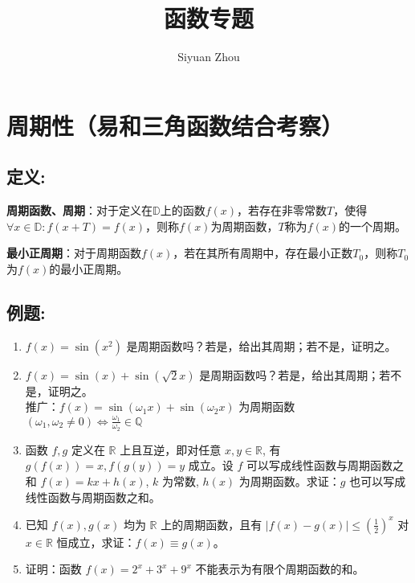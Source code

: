 \documentclass{ctexart}
\title{函数专题}
\author{Siyuan Zhou}
\begin{document}
\maketitle

\section*{周期性（易和三角函数结合考察）}

\subsection*{定义:}
\textbf{周期函数、周期}：对于定义在$\mathbb{D}$上的函数$f(x)$，若存在非零常数$T$，使得$\forall x \in \mathbb{D}: f(x+T) = f(x)$，则称$f(x)$为周期函数，$T$称为$f(x)$的一个周期。\\
\par
\textbf{最小正周期}：对于周期函数$f(x)$，若在其所有周期中，存在最小正数$T_0$，则称$T_0$为$f(x)$的最小正周期。

\subsection*{例题:}
\begin{enumerate}
  \item $f(x)=\sin(x^2)$ 是周期函数吗？若是，给出其周期；若不是，证明之。
  \vspace{20mm}
  \item $f(x)=\sin(x) + \sin(\sqrt{2}x)$ 是周期函数吗？若是，给出其周期；若不是，证明之。\\
    推广：$f(x)=\sin(\omega_1x) + \sin(\omega_2x)$ 为周期函数 $(\omega_1,\omega_2 \neq 0) \Leftrightarrow \frac{\omega_1}{\omega_2} \in \mathbb{Q}$
    \vspace{20mm}
  \item 函数 $f, g$ 定义在 $\mathbb{R}$ 上且互逆，即对任意 $x, y \in \mathbb{R}$, 有 $g(f(x)) = x, f(g(y)) = y$ 成立。设 $f$ 可以写成线性函数与周期函数之和 $f(x) = kx + h(x)$, $k$ 为常数, $h(x)$ 为周期函数。求证：$g$ 也可以写成线性函数与周期函数之和。
  \vspace{60mm}
  \item 已知 $f(x), g(x)$ 均为 $\mathbb{R}$ 上的周期函数，且有 $|f(x) - g(x)| \leq (\frac{1}{2})^x$ 对 $x \in \mathbb{R}$ 恒成立，求证：$f(x) \equiv g(x)$。
  \vspace{100mm}
  \item 证明：函数 $f(x) = 2^x + 3^x + 9^x$ 不能表示为有限个周期函数的和。
\end{enumerate}
\vspace{40mm}
\end{document}
